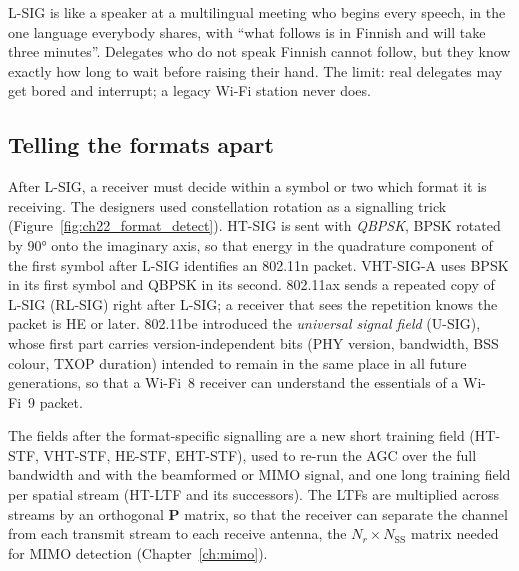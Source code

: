\begin{analogy}
L-SIG is like a speaker at a multilingual meeting who begins every speech, in the one language
everybody shares, with ``what follows is in Finnish and will take three minutes''. Delegates who do
not speak Finnish cannot follow, but they know exactly how long to wait before raising their hand.
The limit: real delegates may get bored and interrupt; a legacy Wi-Fi station never does.
\end{analogy}

\subsection{Telling the formats apart}

After L-SIG, a receiver must decide within a symbol or two which format it is receiving. The
designers used constellation rotation as a signalling trick (Figure~\ref{fig:ch22_format_detect}). HT-SIG is sent with \emph{QBPSK},
BPSK rotated by 90° onto the imaginary axis, so that energy in the quadrature component of the first
symbol after L-SIG identifies an 802.11n packet. VHT-SIG-A uses BPSK in its first symbol and QBPSK in
its second. 802.11ax sends a repeated copy of L-SIG (RL-SIG) right after L-SIG; a receiver that sees
the repetition knows the packet is HE or later. 802.11be introduced the \emph{universal signal
field} (U-SIG), whose first part carries version-independent bits (PHY version, bandwidth, BSS
colour, TXOP duration) intended to remain in the same place in all future generations, so that a
Wi-Fi~8 receiver can understand the essentials of a Wi-Fi~9 packet.

The fields after the format-specific signalling are a new short training field (HT-STF, VHT-STF,
HE-STF, EHT-STF), used to re-run the AGC over the full bandwidth and with the beamformed or MIMO
signal, and one long training field per spatial stream (HT-LTF and its successors). The LTFs are
multiplied across streams by an orthogonal $\mathbf{P}$ matrix, so that the receiver can separate
the channel from each transmit stream to each receive antenna, the $N_r\times N_{\text{SS}}$ matrix
needed for MIMO detection (Chapter~\ref{ch:mimo}).


